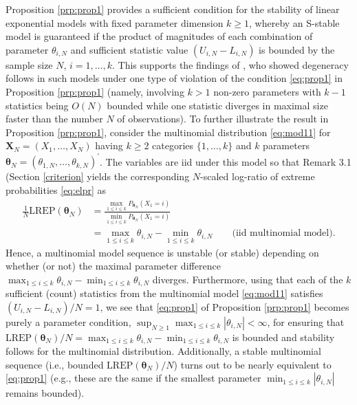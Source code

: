 \documentclass[numbib]{imamat}
\theoremstyle{theorem}
\theoremstyle{lemma}
\theoremstyle{example}
\theoremstyle{corollary}
\theoremstyle{definition}
\theoremstyle{remark}
\theoremstyle{approximation}
\theoremstyle{scheme}
\newcommand{\REP}{\mathrm{LREP}}
\newcommand{\ak}[1]{{\color{blue} #1}}
\begin{document}
Proposition \ref{prp:prop1} provides a sufficient condition for the stability of linear exponential models with fixed parameter dimension \(k\geq 1\), whereby an S-stable model is guaranteed if the \ak{product of magnitudes} of each combination of parameter \(\theta_{i,N}\) and sufficient statistic value \((U_{i,N}-L_{i,N})\) is bounded by the sample size \(N\), \(i=1,\ldots,k\). This supports the findings of \citet{schweinberger2011instability}, who showed degeneracy follows in such models under one type of violation of the condition \eqref{eq:prop1} in Proposition \ref{prp:prop1} (namely, involving \(k>1\) non-zero parameters with \(k-1\) statistics being \(O(N)\) bounded while one statistic diverges in maximal size faster than the number \(N\) of observations). To further illustrate the result in Proposition \ref{prp:prop1}, consider the multinomial distribution \eqref{eq:mod11} for \(\boldsymbol X_N=(X_1,\ldots,X_N)\) having \(k\geq 2\) categories \(\{1,\ldots,k\}\) and \(k\) parameters \(\boldsymbol \theta_N = (\theta_{1,N},\ldots,\theta_{k,N})^\prime\). The variables are iid under this model so that \ak{Remark 3.1} (Section \ref{criterion} yields the corresponding \(N\)-scaled log-ratio of extreme probabilities \eqref{eq:elpr} as
\begin{align*}
  \frac{1}{N}\REP(\boldsymbol \theta_N) &= \frac{\max_{1 \leq i \leq k} P_{\boldsymbol \theta_N}(X_1=i)}{\min_{1 \leq i \leq k} P_{\boldsymbol \theta_N}(X_1=i)}\\
  &= \max_{1 \leq i \leq k} \theta_{i,N} - \min_{1 \leq i \leq k} \theta_{i,N} \qquad \text{(iid multinomial model)}.
\end{align*}
Hence, a multinomial model sequence is unstable (or stable) depending on whether (or not) the maximal parameter difference \(\max_{1 \leq i \leq k} \theta_{i,N} - \min_{1 \leq i \leq k} \theta_{i,N}\) diverges. Furthermore, using that each of the \(k\) sufficient (count) statistics from the multinomial model \eqref{eq:mod11} satisfies \((U_{i,N}-L_{i,N})/N=1\), we see that \eqref{eq:prop1} of Proposition \ref{prp:prop1} becomes purely a parameter condition, \(\sup_{N \geq 1}\max_{1 \leq i \leq k } |\theta_{i,N}| <\infty\), for ensuring that \(\REP(\boldsymbol \theta_N)/N =\max_{1 \leq i \leq k} \theta_{i,N} - \min_{1 \leq i \leq k} \theta_{i,N}\) is bounded and stability follows for the multinomial distribution. Additionally, a stable multinomial sequence (i.e., bounded \(\REP(\boldsymbol \theta_N)/N\)) turns out to be nearly equivalent to \eqref{eq:prop1} (e.g., these are the same if the smallest parameter \(\min_{1 \leq i \leq k } |\theta_{i,N}|\) remains bounded).
\end{document}
